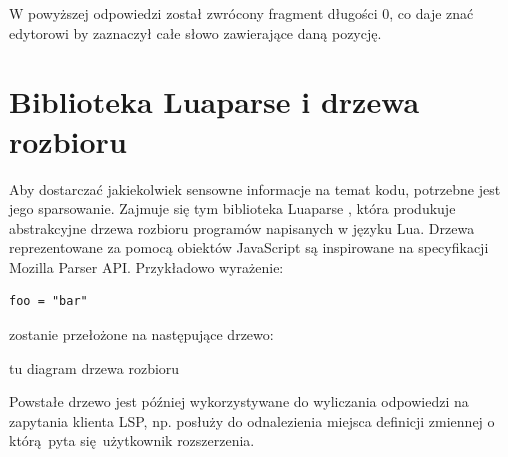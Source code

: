 W powyższej odpowiedzi został zwrócony fragment długości 0, co daje znać edytorowi by zaznaczył całe słowo zawierające daną pozycję.

\section{Biblioteka Luaparse i drzewa rozbioru}
Aby dostarczać jakiekolwiek sensowne informacje na temat kodu, potrzebne jest jego sparsowanie. Zajmuje się tym biblioteka Luaparse \cite{luaparse}, która produkuje abstrakcyjne drzewa rozbioru programów napisanych w języku Lua. Drzewa reprezentowane za pomocą obiektów JavaScript są inspirowane na specyfikacji Mozilla Parser API. Przykładowo wyrażenie:

\begin{lstlisting}[language={[5.3]Lua}]
foo = "bar"
\end{lstlisting}
zostanie przełożone na następujące drzewo:

tu diagram drzewa rozbioru

Powstałe drzewo jest później wykorzystywane do wyliczania odpowiedzi na zapytania klienta LSP, np. posłuży do odnalezienia miejsca definicji zmiennej o którą pyta się użytkownik rozszerzenia.
